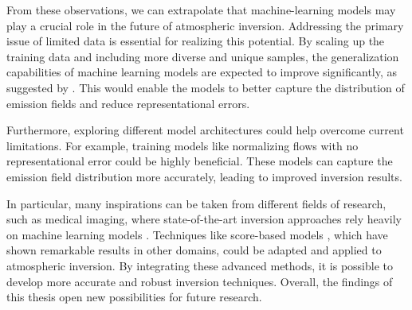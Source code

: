 From these observations, we can extrapolate that machine-learning models may play a crucial role in the future of atmospheric inversion.
Addressing the primary issue of limited data is essential for realizing this potential.
By scaling up the training data and including more diverse and unique samples, the generalization capabilities of machine learning models are expected to improve significantly, as suggested by \parencite{limited-data}. This would enable the models to better capture the distribution of emission fields and reduce representational errors.

Furthermore, exploring different model architectures could help overcome current limitations.
For example, training models like normalizing flows \parencite{NormalizingFlows} with no representational error could be highly beneficial.
These models can capture the emission field distribution more accurately, leading to improved inversion results.

In particular, many inspirations can be taken from different fields of research, such as medical imaging, where state-of-the-art inversion approaches rely heavily on machine learning models \parencite{ReviewCSUsingAI}.
Techniques like score-based models \parencite{ScoreBased}, which have shown remarkable results in other domains, could be adapted and applied to atmospheric inversion.
By integrating these advanced methods, it is possible to develop more accurate and robust inversion techniques.
Overall, the findings of this thesis open new possibilities for future research.

